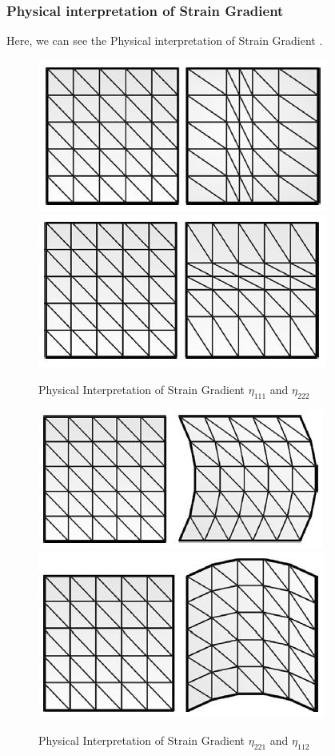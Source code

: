 \documentclass[12pt]{article}
\begin{document}
\subsubsection{ Physical interpretation of Strain Gradient}
Here, we can see the Physical interpretation of Strain Gradient \cite{lesivcar2017two}.
\begin{figure}[H]
	\begin{center}
		\includegraphics[scale=0.8]{U111_Eta_111.JPG}  \qquad \qquad
		\includegraphics[scale=0.8]{U222_Eta_222.JPG}
	\end{center}
   	\caption{Physical Interpretation of Strain Gradient $\eta_{111}$ and $\eta_{222}$}
\end{figure}
\begin{figure}[H]
	\begin{center}
		\includegraphics[scale=0.8]{U122_Eta_122.JPG}  \qquad \qquad
		\includegraphics[scale=0.8]{U211_Eta_211.JPG}
   	\caption{Physical Interpretation of Strain Gradient $\eta_{221}$ and $\eta_{112}$}		
	\end{center}  
\end{figure}
\end{document}
